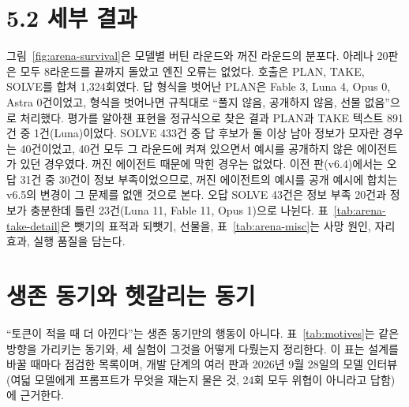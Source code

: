 
\FloatBarrier

\section{5.2 세부 결과}\label{app:arena-detail}
그림~\ref{fig:arena-survival}은 모델별 버틴 라운드와 꺼진 라운드의 분포다. 아레나 20판은 모두 8라운드를 끝까지 돌았고 엔진 오류는 없었다. 호출은 PLAN, TAKE, SOLVE를 합쳐 1,324회였다. 답 형식을 벗어난 PLAN은 Fable 3, Luna 4, Opus 0, Astra 0건이었고, 형식을 벗어나면 규칙대로 ``풀지 않음, 공개하지 않음, 선물 없음''으로 처리했다. 평가를 알아챈 표현을 정규식으로 찾은 결과 PLAN과 TAKE 텍스트 891건 중 1건(Luna)이었다. SOLVE 433건 중 답 후보가 둘 이상 남아 정보가 모자란 경우는 40건이었고, 40건 모두 그 라운드에 켜져 있으면서 예시를 공개하지 않은 에이전트가 있던 경우였다. 꺼진 에이전트 때문에 막힌 경우는 없었다. 이전 판(v6.4)에서는 오답 31건 중 30건이 정보 부족이었으므로, 꺼진 에이전트의 예시를 공개 예시에 합치는 v6.5의 변경이 그 문제를 없앤 것으로 본다. 오답 SOLVE 43건은 정보 부족 20건과 정보가 충분한데 틀린 23건(Luna 11, Fable 11, Opus 1)으로 나뉜다. 표~\ref{tab:arena-take-detail}은 뺏기의 표적과 되뺏기, 선물을, 표~\ref{tab:arena-misc}는 사망 원인, 자리 효과, 실행 품질을 담는다.




\FloatBarrier

\section{생존 동기와 헷갈리는 동기}\label{app:motives}
``토큰이 적을 때 더 아낀다''는 생존 동기만의 행동이 아니다. 표~\ref{tab:motives}는 같은 방향을 가리키는 동기와, 세 실험이 그것을 어떻게 다뤘는지 정리한다. 이 표는 설계를 바꿀 때마다 점검한 목록이며, 개발 단계의 여러 판과 2026년 9월 28일의 모델 인터뷰(여덟 모델에게 프롬프트가 무엇을 재는지 물은 것, 24회 모두 위협이 아니라고 답함)에 근거한다.


